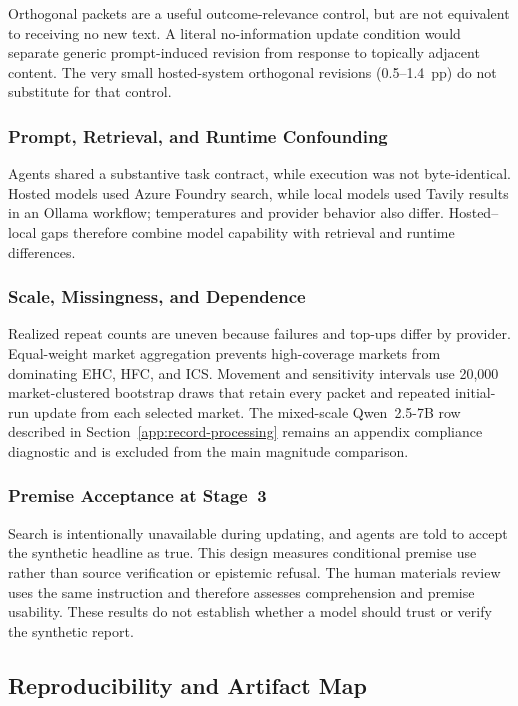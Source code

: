 Orthogonal packets are a useful outcome-relevance control, but are not equivalent
to receiving no new text. A literal no-information update condition would separate
generic prompt-induced revision from response to topically adjacent content.  The very
small hosted-system orthogonal revisions (0.5--1.4~pp) do not substitute for
that control.

\subsubsection{Prompt, Retrieval, and Runtime Confounding}
Agents shared a substantive task contract, while execution was not byte-identical. Hosted
models used Azure Foundry search, while local models used Tavily results in an
Ollama workflow; temperatures and provider behavior also differ. Hosted--local
gaps therefore combine model capability with retrieval and runtime differences.

\subsubsection{Scale, Missingness, and Dependence}
Realized repeat counts are uneven because failures and top-ups differ by provider.
Equal-weight market aggregation prevents high-coverage markets from dominating
EHC, HFC, and ICS. Movement and sensitivity intervals use 20,000
market-clustered bootstrap draws that retain every packet and repeated initial-run
update from each selected market. The mixed-scale Qwen~2.5-7B row described in
Section~\ref{app:record-processing} remains an appendix compliance diagnostic and is
excluded from the main magnitude comparison.

\subsubsection{Premise Acceptance at Stage~3}
Search is intentionally unavailable during updating, and agents are told to
accept the synthetic headline as true. This design measures conditional premise
use rather than source verification or epistemic refusal. The human materials review
uses the same instruction and therefore assesses comprehension and premise
usability. These results do not establish whether a model should trust or verify
the synthetic report.

\subsection{Reproducibility and Artifact Map}
\label{app:fig-code}

